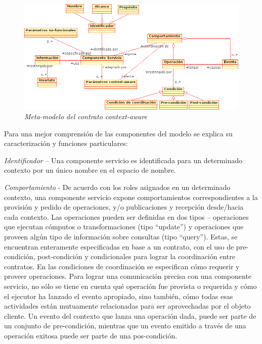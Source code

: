 \begin{figure}[!h]
\begin{center}
		\includegraphics[width=5in,totalheight=2in]{contratoca.png}
                \caption{\small \sl Meta-modelo del contrato context-aware}
\label{contratoca}
\end{center}
\end{figure}
 

Para una mejor comprensión de las componentes del modelo se explica su
caracterización y funciones particulares: 

\textit{Identificador} – Una componente servicio es identificada para un
determinado contexto por un único nombre en el espacio de nombre.

\textit{Comportamiento} -  De acuerdo con los roles asignados en un determinado
contexto, una componente servicio expone comportamientos correspondientes a la
provisión y pedido de operaciones, y/o publicaciones y recepción  desde/hacia
cada contexto. Las operaciones pueden ser definidas en dos tipos – operaciones
que ejecutan cómputos o transformaciones (tipo “update”) y operaciones que
proveen algún tipo de información sobre consultas  (tipo “query”). Estas, se
encuentran enteramente especificadas en base a  un contrato, con el uso de
pre-condición, post-condición y condicionales para lograr la coordinación entre
contratos. En las condiciones de coordinación se especifican cómo requerir y
proveer operaciones. Para lograr una comunicación precisa con una componente
servicio, no sólo se tiene en cuenta qué operación fue provista o requerida y
cómo el ejecutor ha lanzado el evento apropiado, sino también, cómo todas esas
actividades están mutuamente relacionadas para ser aprovechadas por el objeto
cliente. Un evento del contexto que lanza una operación dada, puede ser parte de
un conjunto de pre-condición, mientras que un evento emitido a través de una
operación exitosa puede ser parte de una pos-condición. 

